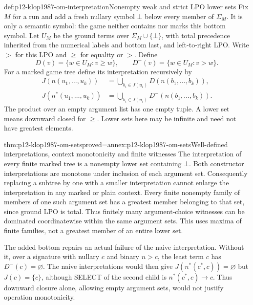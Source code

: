 \begin{hbdefinition}{def:p12-klop1987-om-interpretation}{Nonempty weak and strict LPO lower sets}
Fix \(M\) for a run and add a fresh nullary symbol \(\bot\) below
every member of \(\Sigma_M\). It is only a semantic symbol: the
game neither contains nor marks this bottom symbol. Let \(U_M\) be
the ground terms over \(\Sigma_M\cup\{\bot\}\), with total
precedence inherited from the numerical labels and bottom last, and
left-to-right LPO. Write \(>\) for this LPO and \(\geq\) for
equality or \(>\). Define
\[
 D(v)=\{w\in U_M:v\geq w\},\qquad
 D^-(v)=\{w\in U_M:v>w\}.
\]
For a marked game tree define its interpretation recursively by
\begin{align*}
 J(n(u_1,\ldots,u_k))
  &=\bigcup_{b_i\in J(u_i)}D(n(b_1,\ldots,b_k)),\\
 J(n^*(u_1,\ldots,u_k))
  &=\bigcup_{b_i\in J(u_i)}D^-(n(b_1,\ldots,b_k)).
\end{align*}
The product over an empty argument list has one empty tuple.
A lower set means downward closed for \(\geq\). Lower sets here
may be infinite and need not have greatest elements.
\end{hbdefinition}

\begin{hblemma}{thm:p12-klop1987-om-sets}{proved=annex:p12-klop1987-om-sets}{Well-defined interpretations, context monotonicity and finite witnesses}
The interpretation of every finite marked tree is a nonempty lower
set containing \(\bot\). Both constructor interpretations are
monotone under inclusion of each argument set. Consequently replacing
a subtree by one with a smaller interpretation cannot enlarge the
interpretation in any marked or plain context.
Every finite nonempty family of members of one such argument set has
a greatest member belonging to that set, since ground LPO is total.
Thus finitely many argument-choice witnesses can be dominated
coordinatewise within the same argument sets. This uses maxima of
finite families, not a greatest member of an entire lower set.
\end{hblemma}

The added bottom repairs an actual failure of the naive interpretation.
Without it, over a signature with nullary \(c\) and binary \(n>c\),
the least term \(c\) has \(D^-(c)=\varnothing\). The naive
interpretations would then give \(J(n^*(c^*,c))=\varnothing\)
but \(J(c)=\{c\}\), although SELECT of the second child is
\(n^*(c^*,c)\to c\). Thus downward closure alone, allowing empty
argument sets, would not justify operation monotonicity.

